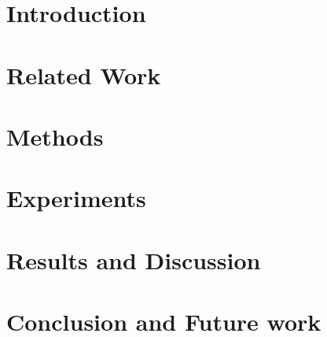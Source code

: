 \documentclass[12pt,twoside,openright]{report}
\makeatletter
\def\cleardoublepage{\clearpage\if@twoside \ifodd\c@page\else
    \hbox{}
    \thispagestyle{empty}
    \newpage
    \if@twocolumn\hbox{}\newpage\fi\fi\fi}
\makeatother
\begin{document}

\cleardoublepage


%


\cleardoublepage


\tableofcontents

\chapter{Introduction}


\chapter{Related Work}


\chapter{Methods}


\chapter{Experiments}


\chapter{Results and Discussion}


\chapter{Conclusion and Future work}





%

%
%
%
\end{document}
